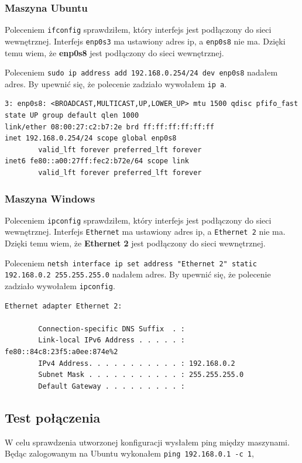 \documentclass{mwart} %
\begin{document}
\subsubsection{Maszyna Ubuntu}
Poleceniem \texttt{ifconfig} sprawdziłem, który interfejs jest podłączony do sieci wewnętrznej. Interfejs \texttt{enp0s3} ma ustawiony adres ip, a \texttt{enp0s8} nie ma. Dzięki temu wiem, że \textbf{enp0s8} jest podłączony do sieci wewnętrznej.

Poleceniem \texttt{sudo ip address add 192.168.0.254/24 dev enp0s8} nadałem adres. By upewnić się, że polecenie zadziało wywołałem \texttt{ip a}.

\begin{verbatim}
3: enp0s8: <BROADCAST,MULTICAST,UP,LOWER_UP> mtu 1500 qdisc pfifo_fast state UP group default qlen 1000
link/ether 08:00:27:c2:b7:2e brd ff:ff:ff:ff:ff:ff
inet 192.168.0.254/24 scope global enp0s8
        valid_lft forever preferred_lft forever
inet6 fe80::a00:27ff:fec2:b72e/64 scope link
        valid_lft forever preferred_lft forever
\end{verbatim}

\subsubsection{Maszyna Windows}
Poleceniem \texttt{ipconfig} sprawdziłem, który interfejs jest podłączony do sieci wewnętrznej. Interfejs \texttt{Ethernet} ma ustawiony adres ip, a \texttt{Ethernet 2} nie ma. Dzięki temu wiem, że \textbf{Ethernet 2} jest podłączony do sieci wewnętrznej.

Poleceniem \texttt{netsh interface ip set address "Ethernet 2" static 192.168.0.2 255.255.255.0} nadałem adres. By upewnić się, że polecenie zadziało wywołałem \texttt{ipconfig}.

\begin{verbatim}
Ethernet adapter Ethernet 2:

        Connection-specific DNS Suffix  . :
        Link-local IPv6 Address . . . . . : fe80::84c8:23f5:a0ee:874e%2
        IPv4 Address. . . . . . . . . . . : 192.168.0.2
        Subnet Mask . . . . . . . . . . . : 255.255.255.0
        Default Gateway . . . . . . . . . :  
\end{verbatim}

\subsection{Test połączenia}
W celu sprawdzenia utworzonej konfiguracji wysłałem ping między maszynami. Będąc zalogowanym na Ubuntu wykonałem \texttt{ping 192.168.0.1 -c 1},
\end{document}
